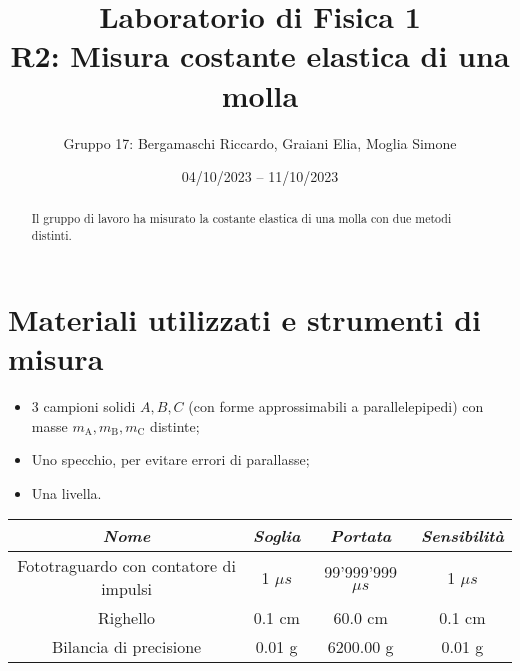 \documentclass{article}
\title{
    Laboratorio di Fisica 1\\
    R2: Misura costante elastica di una molla
}
\author{Gruppo 17: Bergamaschi Riccardo, Graiani Elia, Moglia Simone}
\date{04/10/2023 – 11/10/2023}
\begin{document}
\maketitle

\begin{abstract}
    Il gruppo di lavoro ha misurato la costante elastica di una molla con due metodi distinti.
\end{abstract}

\section{Materiali utilizzati e strumenti di misura}
\begin{itemize}
    \item 3 campioni solidi $A,B,C$ (con forme approssimabili a parallelepipedi) con masse $m_\text{A}, m_\text{B}, m_\text{C}$ distinte;
    \item Uno specchio, per evitare errori di parallasse;
    \item Una livella.
\end{itemize}
\begin{center}
    \begin{tabular}{ |c|c|c|c| }
        \hline
        \emph{Nome} & \emph{Soglia} & \emph{Portata} & \emph{Sensibilità} \\
        \hline
        Fototraguardo con contatore di impulsi & 1 $\mu s$ & 99'999'999 $\mu s$  & 1 $\mu s$ \\
        Righello & 0.1 cm & 60.0 cm & 0.1 cm \\
        Bilancia di precisione & 0.01 g & 6200.00 g & 0.01 g \\
        \hline
    \end{tabular}
\end{center}

\end{document}
